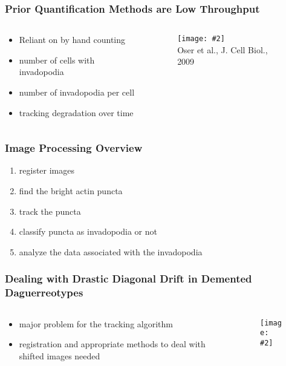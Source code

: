 \documentclass{beamer}
\newcommand{\centerfig}[3]{
	\begin{center}
	\begin{figure}[htbp]
	\texttt{[image: \#2]}
	\\{\tiny #3}
	\end{figure}
	\end{center}
}
\begin{document}
\begin{frame}
	\frametitle{Prior Quantification Methods are Low Throughput}
	\begin{columns}
		\begin{column}{0.5\textwidth}
		\begin{itemize}
		\item Reliant on by hand counting
		\item number of cells with invadopodia
		\item number of invadopodia per cell
		\item tracking degradation over time
		\end{itemize}
		\end{column}
		
		\begin{column}{0.5\textwidth}
		\centerfig{width=\textwidth}{figures/invado_over_time}{Oser et al., J.
		Cell Biol., 2009}
		\end{column}
	\end{columns}
\end{frame}

\begin{frame}
	\frametitle{Image Processing Overview}
	\begin{enumerate}
	\item register images
	\item find the bright actin puncta
	\item track the puncta
	\item classify puncta as invadopodia or not
	\item analyze the data associated with the invadopodia
	\end{enumerate}
\end{frame}

\begin{frame}
	\frametitle{Dealing with Drastic Diagonal Drift in Demented Daguerreotypes}
	\begin{columns}
		\begin{column}{0.5\textwidth}
		\begin{itemize}
		\item major problem for the tracking algorithm
		\item registration and appropriate methods to deal with shifted images
		needed
		\end{itemize}
		\end{column}
		
		\begin{column}{0.5\textwidth}
		\centerfig{height=0.75\textheight}{figures/cascade_diagram}{}
		\end{column}
	\end{columns}
\end{frame}
\end{document}
